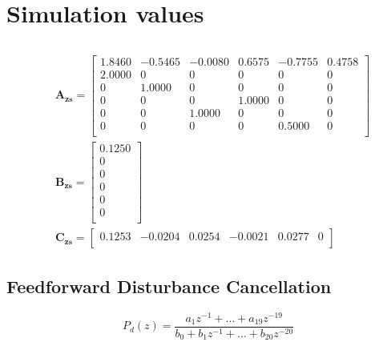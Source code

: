 \chapter{Simulation values}\label{cha:definition}

\section{\abbrRFDC}\label{app:rfdc}
\begin{subequations}
  \label{eq:sysmatrices}
  \begin{alignat}{2}
  & \mathbf{A_{zs}} =
    \begin{bmatrix}
  1.8460 &  -0.5465 &  -0.0080 &   0.6575 &  -0.7755 &   0.4758\\
  2.0000 &        0 &        0 &        0 &        0 &        0\\
       0 &   1.0000 &        0 &        0 &        0 &        0\\
       0 &        0 &        0 &   1.0000 &        0 &        0\\
       0 &        0 &   1.0000 &        0 &        0 &        0\\
       0 &        0 &        0 &        0 &   0.5000 &        0\\
    \end{bmatrix}\\
  & \mathbf{B_{zs}} =
  \begin{bmatrix}
    0.1250\\
         0\\
         0\\
         0\\
         0\\
         0\\
  \end{bmatrix} \\
  & \mathbf{C_{zs}} =
  \begin{bmatrix}
      0.1253  & -0.0204  &  0.0254  & -0.0021  &  0.0277     &    0\\
  \end{bmatrix}
  \end{alignat}
\end{subequations}

\newpage
\section{Feedforward Disturbance Cancellation}\label{app:fdc}

\begin{equation}
  P_d(z) = \frac{a_1z^{-1} + \hdots + a_{19}z^{-19}}{b_0 + b_1z^{-1} + \hdots + b_{20}z^{-20}}
\end{equation}

